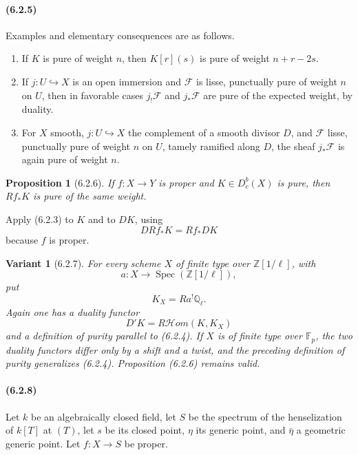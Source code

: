 \documentclass[11pt]{article}
\newtheorem{proposition}{Proposition}
\newtheorem{variant}{Variant}
\theoremstyle{remark}
\newcommand{\Ql}{\mathbb{Q}_\ell}
\newcommand{\ZZ}{\mathbb{Z}}
\begin{document}
\paragraph{(6.2.5)}
Examples and elementary consequences are as follows.
\begin{enumerate}[label=\alph*)]
\item If \(K\) is pure of weight \(n\), then \(K[r](s)\) is pure of weight \(n+r-2s\).
\item If \(j:U\hookrightarrow X\) is an open immersion and \(\mathcal F\) is lisse, punctually pure of weight \(n\) on \(U\), then in favorable cases \(j_!\mathcal F\) and \(j_*\mathcal F\) are pure of the expected weight, by duality.
\item For \(X\) smooth, \(j:U\hookrightarrow X\) the complement of a smooth divisor \(D\), and \(\mathcal F\) lisse, punctually pure of weight \(n\) on \(U\), tamely ramified along \(D\), the sheaf \(j_*\mathcal F\) is again pure of weight \(n\).
\end{enumerate}

\begin{proposition}[6.2.6]
If \(f:X\to Y\) is proper and \(K\in D^b_c(X)\) is pure, then \(Rf_*K\) is pure of the same weight.
\end{proposition}

Apply (6.2.3) to \(K\) and to \(DK\), using
\[
DRf_*K=Rf_*DK
\]
because \(f\) is proper.

\begin{variant}[6.2.7]
For every scheme \(X\) of finite type over \(\ZZ[1/\ell]\), with
\[
a:X\longrightarrow \operatorname{Spec}(\ZZ[1/\ell]),
\]
put
\[
K_X=Ra^!\Ql.
\]
Again one has a duality functor
\[
D'K=R\mathcal Hom(K,K_X)
\]
and a definition of purity parallel to (6.2.4).  If \(X\) is of finite type over \(\mathbb F_p\), the two duality functors differ only by a shift and a twist, and the preceding definition of purity generalizes (6.2.4).  Proposition (6.2.6) remains valid.
\end{variant}

\paragraph{(6.2.8)}
Let \(k\) be an algebraically closed field, let \(S\) be the spectrum of the henselization of \(k[T]\) at \((T)\), let \(s\) be its closed point, \(\eta\) its generic point, and \(\bar\eta\) a geometric generic point.  Let \(f:X\to S\) be proper.
\end{document}
